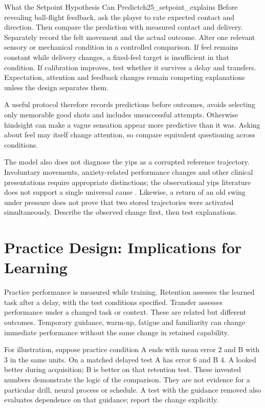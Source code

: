 \begin{example}{What the Setpoint Hypothesis Can Predict}{ch25_setpoint_explains}
Before revealing ball-flight feedback, ask the player to rate expected contact and direction. Then compare the prediction with measured contact and delivery. Separately record the felt movement and the actual outcome. Alter one relevant sensory or mechanical condition in a controlled comparison. If feel remains constant while delivery changes, a fixed-feel target is insufficient in that condition. If calibration improves, test whether it survives a delay and transfers. Expectation, attention and feedback changes remain competing explanations unless the design separates them.
\end{example}

A useful protocol therefore records predictions before outcomes, avoids selecting only memorable good shots and includes unsuccessful attempts. Otherwise hindsight can make a vague sensation appear more predictive than it was. Asking about feel may itself change attention, so compare equivalent questioning across conditions.

The model also does not diagnose the yips as a corrupted reference trajectory. Involuntary movements, anxiety-related performance changes and other clinical presentations require appropriate distinctions; the observational yips literature does not support a single universal cause \citep{Adler2011Yips}. Likewise, a return of an old swing under pressure does not prove that two stored trajectories were activated simultaneously. Describe the observed change first, then test explanations.

\section{Practice Design: Implications for Learning}
\label{sec:ch25_practice_design}

Practice performance is measured while training. Retention assesses the learned task after a delay, with the test conditions specified. Transfer assesses performance under a changed task or context. These are related but different outcomes. Temporary guidance, warm-up, fatigue and familiarity can change immediate performance without the same change in retained capability.

For illustration, suppose practice condition A ends with mean error $2$ and B with $3$ in the same units. On a matched delayed test A has error $6$ and B $4$. A looked better during acquisition; B is better on that retention test. These invented numbers demonstrate the logic of the comparison. They are not evidence for a particular drill, neural process or schedule. A test with the guidance removed also evaluates dependence on that guidance; report the change explicitly.

